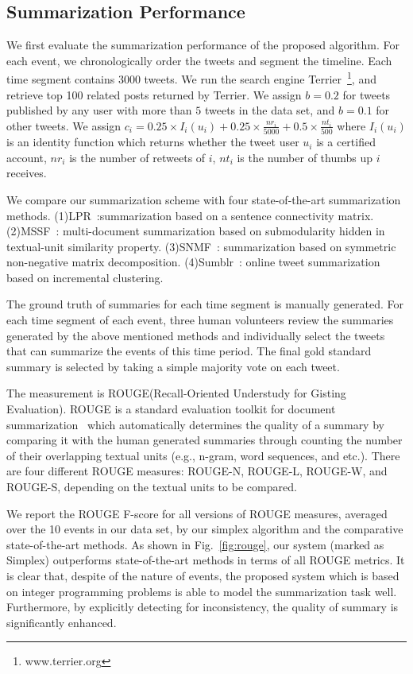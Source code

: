 \documentclass[envcountsame]{llncs}
\begin{document}
\subsection{Summarization Performance}
We first evaluate the summarization performance of the proposed algorithm. For each event, we chronologically order the tweets and segment the timeline. Each time segment contains 3000 tweets. We run the search engine Terrier~\footnote{www.terrier.org}, and  retrieve top 100 related posts returned by Terrier. We assign $b=0.2$ for tweets published by any user with more than $5$ tweets in the data set, and $b=0.1$ for other tweets. We assign $c_i=0.25\times I_i(u_i) + 0.25\times \frac{nr_i}{5000}+ 0.5 \times \frac{nt_i}{500}$ where $I_i(u_i)$ is an identity function which returns whether the tweet user $u_i$ is a certified account, $nr_i$ is the number of retweets of $i$, $nt_i$ is the number of thumbs up  $i$ receives.

We compare our summarization scheme with  four state-of-the-art summarization methods. (1)LPR~\cite{LPR}:summarization based on a sentence connectivity matrix. (2)MSSF~\cite{MSSF}:  multi-document summarization based on submodularity hidden in textual-unit similarity property. (3)SNMF~\cite{SNMF}: summarization based on  symmetric non-negative matrix decomposition. (4)Sumblr~\cite{Shou2013Sumblr}: online tweet summarization based on incremental clustering.

The ground truth of summaries for each time segment is manually generated. For each time segment of each event, three human volunteers review the summaries generated by the above mentioned methods and individually select the tweets that can summarize the events of this time period. The final gold standard summary is selected by taking a simple majority vote on each tweet.

The measurement is ROUGE(Recall-Oriented Understudy for Gisting Evaluation). ROUGE is a standard evaluation toolkit for document summarization~\cite{ROUGE} which automatically determines the quality of a summary by comparing it with the human generated summaries through counting the number of their overlapping textual units (e.g., n-gram, word sequences, and etc.). There are four different ROUGE measures: ROUGE-N, ROUGE-L, ROUGE-W, and ROUGE-S, depending on the textual units to be compared.

We report the  ROUGE F-score for all versions of ROUGE measures, averaged over the 10 events in our data set, by our simplex algorithm and the comparative state-of-the-art methods. As shown in Fig.~\ref{fig:rouge}, our system (marked as Simplex) outperforms state-of-the-art methods in terms of all ROUGE metrics. It is clear that, despite of the nature of events, the proposed system which is based on integer programming problems is able to model the summarization task well. Furthermore, by explicitly detecting for inconsistency, the quality of summary is significantly enhanced.
\end{document}
